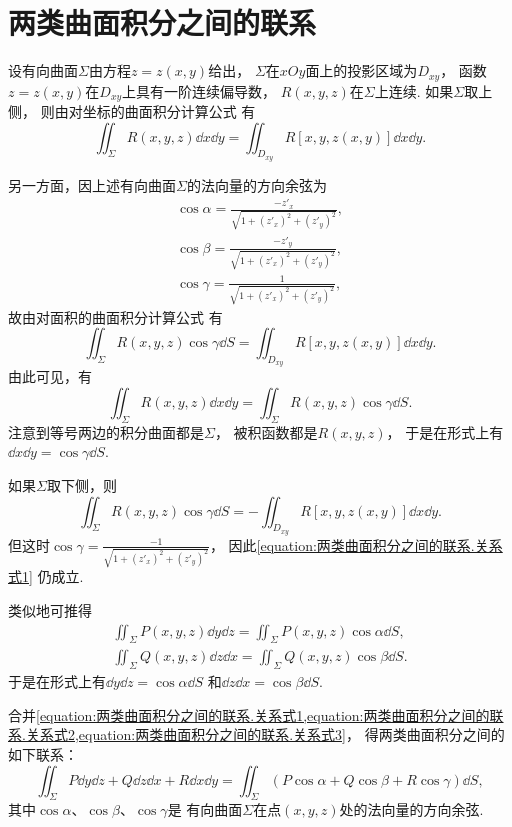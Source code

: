\section{两类曲面积分之间的联系}
设有向曲面\(\Sigma\)由方程\(z = z(x,y)\)给出，
\(\Sigma\)在\(xOy\)面上的投影区域为\(D_{xy}\)，
函数\(z = z(x,y)\)在\(D_{xy}\)上具有一阶连续偏导数，
\(R(x,y,z)\)在\(\Sigma\)上连续.
如果\(\Sigma\)取上侧，
则由对坐标的曲面积分计算公式  有\[
	\iint_\Sigma R(x,y,z) \dd{x}\dd{y} = \iint_{D_{xy}} R[x,y,z(x,y)] \dd{x}\dd{y}.
\]

另一方面，因上述有向曲面\(\Sigma\)的法向量的方向余弦为\[
	\begin{split}
		\cos\alpha=\frac{-z'_x}{\sqrt{1+(z'_x)^2+(z'_y)^2}}, \\
		\cos\beta=\frac{-z'_y}{\sqrt{1+(z'_x)^2+(z'_y)^2}}, \\
		\cos\gamma=\frac{1}{\sqrt{1+(z'_x)^2+(z'_y)^2}},
	\end{split}
\]
故由对面积的曲面积分计算公式  有\[
	\iint_\Sigma R(x,y,z) \cos\gamma \dd{S}
	= \iint_{D_{xy}} R[x,y,z(x,y)] \dd{x}\dd{y}.
\]
由此可见，有\begin{equation}\label{equation:两类曲面积分之间的联系.关系式1}
	\iint_\Sigma R(x,y,z) \dd{x}\dd{y}
	= \iint_\Sigma R(x,y,z) \cos\gamma \dd{S}.
\end{equation}
注意到等号两边的积分曲面都是\(\Sigma\)，
被积函数都是\(R(x,y,z)\)，
于是在形式上有\(\dd{x}\dd{y} = \cos\gamma \dd{S}\).

如果\(\Sigma\)取下侧，则\[
	\iint_\Sigma R(x,y,z) \cos\gamma \dd{S}
	= -\iint_{D_{xy}} R[x,y,z(x,y)] \dd{x}\dd{y}.
\]
但这时\(\cos\gamma=\frac{-1}{\sqrt{1+(z'_x)^2+(z'_y)^2}}\)，
因此\cref{equation:两类曲面积分之间的联系.关系式1} 仍成立.

类似地可推得\begin{gather}
	\iint_\Sigma P(x,y,z) \dd{y}\dd{z}
	= \iint_\Sigma P(x,y,z) \cos\alpha \dd{S},
	\label{equation:两类曲面积分之间的联系.关系式2} \\
	\iint_\Sigma Q(x,y,z) \dd{z}\dd{x}
	= \iint_\Sigma Q(x,y,z) \cos\beta \dd{S}.
	\label{equation:两类曲面积分之间的联系.关系式3}
\end{gather}
于是在形式上有\(\dd{y}\dd{z} = \cos\alpha \dd{S}\)
和\(\dd{z}\dd{x} = \cos\beta \dd{S}\).

合并\cref{equation:两类曲面积分之间的联系.关系式1,equation:两类曲面积分之间的联系.关系式2,equation:两类曲面积分之间的联系.关系式3}，
得两类曲面积分之间的如下联系：
\begin{equation}\label{equation:线积分与面积分.两类曲面积分之间的联系}
	\iint_\Sigma P \dd{y}\dd{z} + Q \dd{z}\dd{x} + R \dd{x}\dd{y}
	=\iint_\Sigma (P\cos\alpha+Q\cos\beta+R\cos\gamma) \dd{S},
\end{equation}
其中\(\cos\alpha\)、\(\cos\beta\)、\(\cos\gamma\)是
有向曲面\(\Sigma\)在点\((x,y,z)\)处的法向量的方向余弦.

